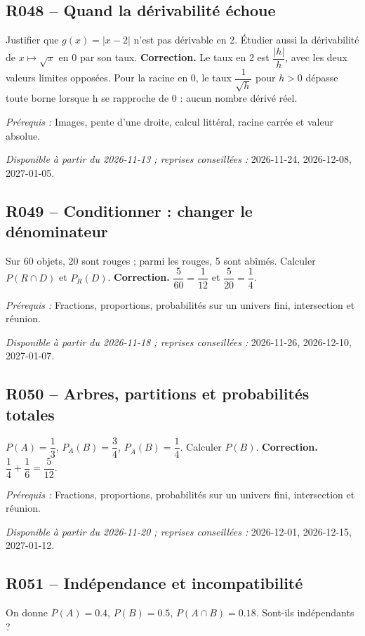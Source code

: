 \subsection*{R048 -- Quand la dérivabilité échoue}\label{R048}
Justifier que $g(x)=|x-2|$ n’est pas dérivable en 2. Étudier aussi la dérivabilité de $x\mapsto\sqrt{x}$ en 0 par son taux.
\ifmxteacher\textbf{Correction.} Le taux en 2 est $\dfrac{|h|}{h}$, avec les deux valeurs limites opposées. Pour la racine en 0, le taux $\dfrac{1}{\sqrt h}$ pour $h>0$ dépasse toute borne lorsque h se rapproche de 0 : aucun nombre dérivé réel.\par\textit{Prérequis :} Images, pente d’une droite, calcul littéral, racine carrée et valeur absolue.\par\textit{Disponible à partir du 2026-11-13 ; reprises conseillées :} 2026-11-24, 2026-12-08, 2027-01-05.\fi
{}\subsection*{R049 -- Conditionner : changer le dénominateur}\label{R049}
Sur 60 objets, 20 sont rouges ; parmi les rouges, 5 sont abîmés. Calculer $P(R\cap D)$ et $P_R(D)$.
\ifmxteacher\textbf{Correction.} $\dfrac{5}{60}=\dfrac{1}{12}$ et $\dfrac{5}{20}=\dfrac{1}{4}$.\par\textit{Prérequis :} Fractions, proportions, probabilités sur un univers fini, intersection et réunion.\par\textit{Disponible à partir du 2026-11-18 ; reprises conseillées :} 2026-11-26, 2026-12-10, 2027-01-07.\fi
{}\subsection*{R050 -- Arbres, partitions et probabilités totales}\label{R050}
$P(A)=\dfrac{1}{3}$, $P_A(B)=\dfrac{3}{4}$, $P_{\overline A}(B)=\dfrac{1}{4}$. Calculer $P(B)$.
\ifmxteacher\textbf{Correction.} $\dfrac{1}{4}+\dfrac{1}{6}=\dfrac{5}{12}$.\par\textit{Prérequis :} Fractions, proportions, probabilités sur un univers fini, intersection et réunion.\par\textit{Disponible à partir du 2026-11-20 ; reprises conseillées :} 2026-12-01, 2026-12-15, 2027-01-12.\fi
{}\subsection*{R051 -- Indépendance et incompatibilité}\label{R051}
On donne $P(A)=\num{0,4}$, $P(B)=\num{0,5}$, $P(A\cap B)=\num{0,18}$. Sont-ils indépendants ?
